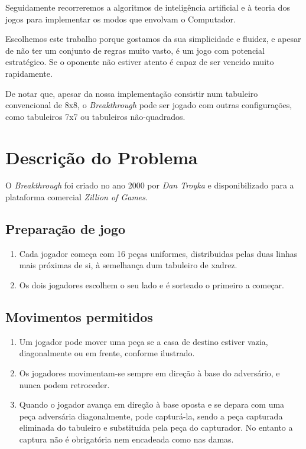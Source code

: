 \documentclass[15pt,a4paper]{article}
\begin{document}
Seguidamente recorreremos a algoritmos de inteligência artificial e à teoria dos jogos para implementar os modos que envolvam o Computador.


Escolhemos este trabalho porque gostamos da sua simplicidade e fluidez, e apesar de não ter um conjunto de regras muito vasto, é um jogo com potencial estratégico. 
Se o oponente não estiver atento é capaz de ser vencido muito rapidamente.

De notar que, apesar da nossa implementação consistir num tabuleiro convencional de 8x8, o \textit{Breakthrough} pode ser jogado com outras configurações, como tabuleiros 7x7 ou tabuleiros não-quadrados.


\section{Descrição do Problema}


O \textit{Breakthrough} foi criado no ano 2000 por \textit{Dan Troyka}  e disponibilizado para a plataforma comercial \textit{Zillion of Games}.

\subsection{Preparação de jogo}
\begin{enumerate}
\item Cada jogador começa com 16 peças uniformes, distribuidas pelas duas linhas mais próximas de si, à semelhança dum tabuleiro de xadrez.
\item Os dois jogadores escolhem o seu lado e é sorteado o primeiro a começar.
\end{enumerate}

\subsection{Movimentos permitidos}
\begin{enumerate}
\item Um jogador pode mover uma peça se a casa de destino estiver vazia, diagonalmente ou em frente, conforme ilustrado.
\item Os jogadores movimentam-se sempre em direção à base do adversário, e nunca podem retroceder.
\item Quando o jogador avança em direção à base oposta e se depara com uma peça adversária diagonalmente, pode capturá-la, sendo a peça capturada eliminada do tabuleiro e substituída pela peça do capturador. 
No entanto a captura não é obrigatória nem encadeada como nas damas.
\end{enumerate}
\end{document}
